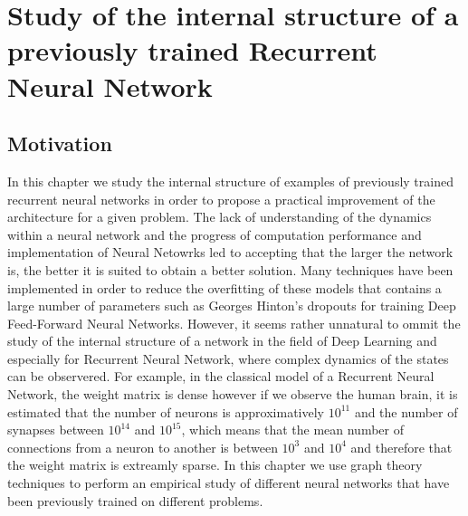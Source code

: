 
\chapter{ Study of the internal structure of a previously trained Recurrent Neural Network} %

\label{Chapter 2} %




\section{Motivation}

In this chapter we study the internal structure of examples of previously trained recurrent neural networks in order to propose a practical improvement of the architecture for a given problem. The lack of understanding of the dynamics within a neural network and the progress of computation performance and implementation of Neural Netowrks led to accepting that the larger the network is, the better it is suited to obtain a better solution. Many techniques have been implemented in order to reduce the overfitting of these models that contains a large number of parameters such as Georges Hinton's dropouts for training Deep Feed-Forward Neural Networks. However, it seems rather unnatural to ommit the study of the internal structure of a network in the field of Deep Learning and especially for Recurrent Neural Network, where complex dynamics of the states can be observered. For example, in the classical model of a Recurrent Neural Network, the weight matrix is dense however if we observe the human brain, it is estimated that the number of neurons is approximatively $10^11$ and the number of synapses between $10^14$ and $10^15$, which means that the mean number of connections from a neuron to another is between $10^3$ and $10^4$ and therefore that the weight matrix is extreamly sparse. In this chapter we use graph theory techniques to perform an empirical study of different neural networks that have been previously trained on different problems. 

